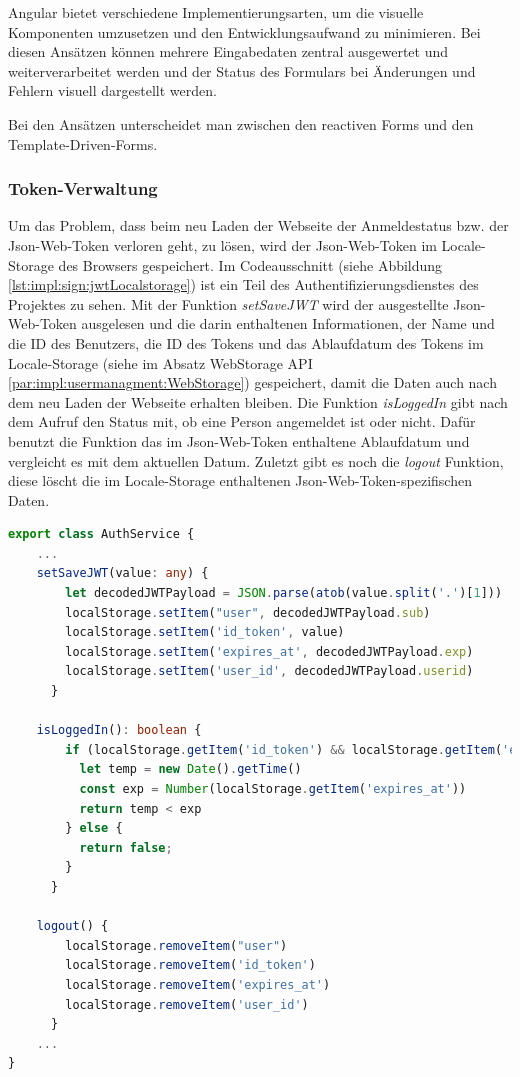 Angular bietet verschiedene Implementierungsarten, um die visuelle Komponenten umzusetzen und den Entwicklungsaufwand zu minimieren. Bei diesen Ansätzen können mehrere Eingabedaten zentral ausgewertet und weiterverarbeitet werden und der Status des Formulars bei Änderungen und Fehlern visuell dargestellt werden. \cite[12.1 S.276]{AngularBuch}

Bei den Ansätzen unterscheidet man zwischen den reactiven Forms und den Template-Driven-Forms.

\subsubsection{Token-Verwaltung}
\label{sec:tokenveraltung}
Um das Problem, dass beim neu Laden der Webseite der Anmeldestatus bzw. der Json-Web-Token verloren geht, zu lösen, wird der Json-Web-Token im Locale-Storage des Browsers gespeichert. 
Im Codeausschnitt (siehe Abbildung \ref{lst:impl:sign:jwtLocalstorage}) ist ein Teil des Authentifizierungsdienstes des Projektes zu sehen. Mit der Funktion \emph{setSaveJWT} wird der ausgestellte Json-Web-Token ausgelesen und die darin enthaltenen Informationen, der Name und die ID des Benutzers, die ID des Tokens und das Ablaufdatum des Tokens im Locale-Storage (siehe im Absatz WebStorage API \ref{par:impl:usermanagment:WebStorage}) gespeichert, damit die Daten auch nach dem neu Laden der Webseite erhalten bleiben. Die Funktion \emph{isLoggedIn} gibt nach dem Aufruf den Status mit, ob eine Person angemeldet ist oder nicht. Dafür benutzt die Funktion das im Json-Web-Token enthaltene Ablaufdatum und vergleicht es mit dem aktuellen Datum. Zuletzt gibt es noch die \emph{logout} Funktion, diese löscht die im Locale-Storage enthaltenen Json-Web-Token-spezifischen Daten.

\begin{lstlisting}[caption=auth.service.ts - Json-Web-Token und Localstorage,label=lst:impl:sign:jwtLocalstorage,language=TypeScript ]
export class AuthService {
    ...
    setSaveJWT(value: any) {
        let decodedJWTPayload = JSON.parse(atob(value.split('.')[1]))
        localStorage.setItem("user", decodedJWTPayload.sub)
        localStorage.setItem('id_token', value)
        localStorage.setItem('expires_at', decodedJWTPayload.exp)
        localStorage.setItem('user_id', decodedJWTPayload.userid)
      }

    isLoggedIn(): boolean {
        if (localStorage.getItem('id_token') && localStorage.getItem('expires_at')) {
          let temp = new Date().getTime()
          const exp = Number(localStorage.getItem('expires_at'))
          return temp < exp
        } else {
          return false;
        }
      }

    logout() {
        localStorage.removeItem("user")
        localStorage.removeItem('id_token')
        localStorage.removeItem('expires_at')
        localStorage.removeItem('user_id')
      }
    ...
}        
\end{lstlisting}

